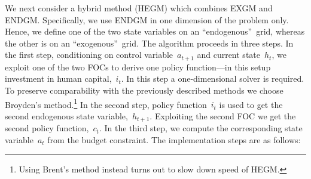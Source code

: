 \documentclass[a4paper,12pt]{article}
\begin{document}
We next consider a hybrid method (HEGM) which combines EXGM and ENDGM. Specifically, we use ENDGM in one dimension of the problem only. Hence, we define one of the two state variables on an \textquotedblleft endogenous\textquotedblright\ grid, whereas the other is on an \textquotedblleft exogenous\textquotedblright\ grid. The algorithm proceeds in three steps. In the first step, conditioning on control variable~$a_{t+1}$ and current state~$h_{t}$, we exploit one of the two FOCs to derive one policy function---in this setup investment in human capital,~$i_{t}$. In this step a one-dimensional solver is required. To preserve comparability with the previously described methods we choose Broyden's method.\footnote{Using Brent's method instead turns out to slow down speed of HEGM.}
In the second step, policy function~$i_{t}$ is used to get the second endogenous state variable,~$h_{t+1}$. Exploiting the second FOC we get the second policy function,~$c_{t}$. In the third step, we compute the corresponding state variable~$a_{t}$ from the budget constraint. The implementation steps are as follows:
\end{document}
